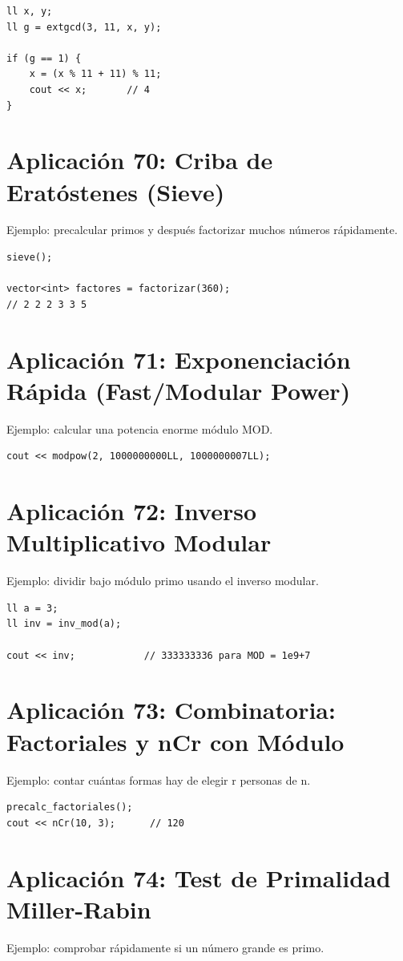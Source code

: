 \documentclass[10pt,twocolumn,letterpaper]{report}
\begin{document}
\begin{lstlisting}
ll x, y;
ll g = extgcd(3, 11, x, y);

if (g == 1) {
    x = (x % 11 + 11) % 11;
    cout << x;       // 4
}
\end{lstlisting}

\section{Aplicación 70: Criba de Eratóstenes (Sieve)}
Ejemplo: precalcular primos y después factorizar muchos números rápidamente.

\begin{lstlisting}
sieve();

vector<int> factores = factorizar(360);
// 2 2 2 3 3 5
\end{lstlisting}

\section{Aplicación 71: Exponenciación Rápida (Fast/Modular Power)}
Ejemplo: calcular una potencia enorme módulo MOD.

\begin{lstlisting}
cout << modpow(2, 1000000000LL, 1000000007LL);
\end{lstlisting}

\section{Aplicación 72: Inverso Multiplicativo Modular}
Ejemplo: dividir bajo módulo primo usando el inverso modular.

\begin{lstlisting}
ll a = 3;
ll inv = inv_mod(a);

cout << inv;            // 333333336 para MOD = 1e9+7
\end{lstlisting}

\section{Aplicación 73: Combinatoria: Factoriales y nCr con Módulo}
Ejemplo: contar cuántas formas hay de elegir r personas de n.

\begin{lstlisting}
precalc_factoriales();
cout << nCr(10, 3);      // 120
\end{lstlisting}

\section{Aplicación 74: Test de Primalidad Miller-Rabin}
Ejemplo: comprobar rápidamente si un número grande es primo.
\end{document}
